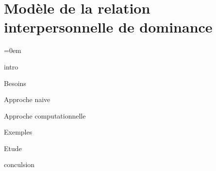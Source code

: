 \chapter[Relation interpersonnelle de dominance]{Modèle de la relation interpersonnelle de dominance}
\label{chap:Tom}

\begingroup
\parindent=0em
\localtableofcontents 
\clearpage
\endgroup

intro

Besoins

Approche naive

Approche computationnelle

Exemples

Etude

conculsion